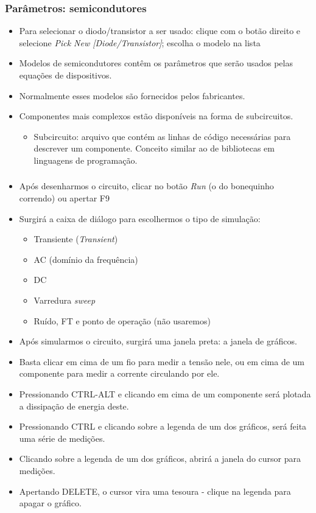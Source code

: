 \documentclass{beamer}
\begin{document}
\begin{frame}
\frametitle{Parâmetros: semicondutores}
\begin{itemize}
\item{Para selecionar o diodo/transistor a ser usado: clique com o botão direito e selecione \textit{Pick New [Diode/Transistor]}; escolha o modelo na lista}
\item{Modelos de semicondutores contêm os parâmetros que serão usados pelas equações de dispositivos.}
\item{Normalmente esses modelos são fornecidos pelos fabricantes.}
\item{Componentes mais complexos estão disponíveis na forma de subcircuitos.}
\begin{itemize}
\item{Subcircuito}: arquivo que contém as linhas de código necessárias para descrever um componente. Conceito similar ao de bibliotecas em linguagens de programação.
\end{itemize}
\end{itemize}
\end{frame}

\begin{frame}
\frametitle{}
\begin{itemize}
\item{Após desenharmos o circuito, clicar no botão \textit{Run} (o do bonequinho correndo) ou apertar F9}
\item{Surgirá a caixa de diálogo para escolhermos o tipo de simulação:}
\begin{itemize}
\item{Transiente (\textit{Transient})}
\item{AC (domínio da frequência)}
\item{DC}
\item{Varredura \textit{sweep}}
\item{Ruído, FT e ponto de operação (não usaremos)}
\end{itemize}
\end{itemize}
\end{frame}

\begin{frame}
\begin{itemize}
\item{Após simularmos o circuito, surgirá uma janela preta: a janela de gráficos.}
\item{Basta clicar em cima de um fio para medir a tensão nele, ou em cima de um componente para medir a corrente circulando por ele.}
\item{Pressionando CTRL-ALT e clicando em cima de um componente será plotada a dissipação de energia deste.}
\item{Pressionando CTRL e clicando sobre a legenda de um dos gráficos, será feita uma série de medições.}
\item{Clicando sobre a legenda de um dos gráficos, abrirá a janela do cursor para medições.}
\item{Apertando DELETE, o cursor vira uma tesoura - clique na legenda para apagar o gráfico.}
\end{itemize}
\end{frame}
\end{document}
